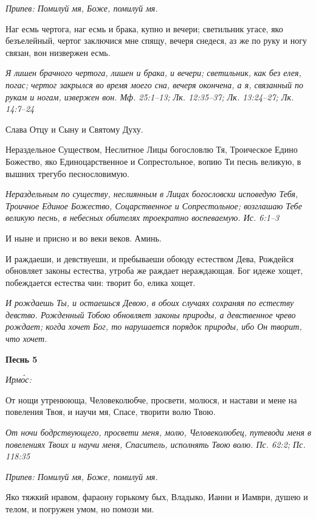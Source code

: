 \itshape Припев:\normalfont{} Помилуй мя, Боже, помилуй мя.


Наг есмь чертога, наг есмь и брака, купно и вечери; светильник угасе, яко безъелейный, чертог заключися мне спящу, вечеря снедеся, аз же по руку и ногу связан, вон низвержен есмь.


\itshape Я лишен брачного чертога, лишен и брака, и вечери; светильник, как без елея, погас; чертог закрылся во время моего сна, вечеря окончена, а я, связанный по рукам и ногам, извержен вон. Мф. 25:1–13; Лк. 12:35–37; Лк. 13:24–27; Лк. 14:7–24\normalfont{}


Слава Отцу и Сыну и Святому Духу.


Нераздельное Существом, Неслитное Лицы богословлю Тя, Троическое Едино Божество, яко Единоцарственное и Сопрестольное, вопию Ти песнь великую, в вышних трегубо песнословимую.


\itshape Нераздельным по существу, неслиянным в Лицах богословски исповедую Тебя, Троичное Единое Божество, Соцарственное и Сопрестольное; возглашаю Тебе великую песнь, в небесных обителях троекратно воспеваемую. Ис. 6:1–3\normalfont{}


И ныне и присно и во веки веков. Аминь.


И раждаеши, и девствуеши, и пребываеши обоюду естеством Дева, Рождейся обновляет законы естества, утроба же раждает нераждающая. Бог идеже хощет, побеждается естества чин: творит бо, елика хощет.


\itshape И рождаешь Ты, и остаешься Девою, в обоих случаях сохраняя по естеству девство. Рожденный Тобою обновляет законы природы, а девственное чрево рождает; когда хочет Бог, то нарушается порядок природы, ибо Он творит, что хочет.\normalfont{}





\bfseries Песнь 5\normalfont{}


\itshape Ирмо́с:\normalfont{}


От нощи утренююща, Человеколюбче, просвети, молюся, и настави и мене на повеления Твоя, и научи мя, Спасе, творити волю Твою.


\itshape От ночи бодрствующего, просвети меня, молю, Человеколюбец, путеводи меня в повелениях Твоих и научи меня, Спаситель, исполнять Твою волю. Пс. 62:2; Пс. 118:35\normalfont{}


\itshape Припев:\normalfont{} Помилуй мя, Боже, помилуй мя.


Яко тяжкий нравом, фараону горькому бых, Владыко, Ианни и Иамври, душею и телом, и погружен умом, но помози ми.


